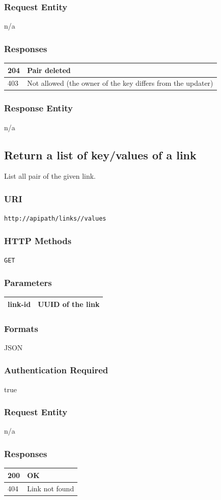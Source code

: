 \documentclass[10pt]{article}
\begin{document}
\subsubsection{Request Entity}
n/a
\subsubsection{Responses}
\begin{tabular}{|l|l|}\hline
204 & Pair deleted \\
\hline
403 & Not allowed (the owner of the key differs from the updater) \\
\hline
\end{tabular}
\subsubsection{Response Entity}
n/a
\subsection{Return a list of key/values of a link}
List all pair of the given link.
\subsubsection{URI}
\texttt{http://apipath/links//values
}\subsubsection{HTTP Methods}
\texttt{GET}
\subsubsection{Parameters}
\begin{tabular}{|l|l|}\hline
link-id & UUID of the link \\
\hline
\end{tabular}
\subsubsection{Formats}
JSON
\subsubsection{Authentication Required}
true
\subsubsection{Request Entity}
n/a
\subsubsection{Responses}
\begin{tabular}{|l|l|}\hline
200 & OK \\
\hline
404 & Link not found \\
\hline
\end{tabular}
\end{document}
